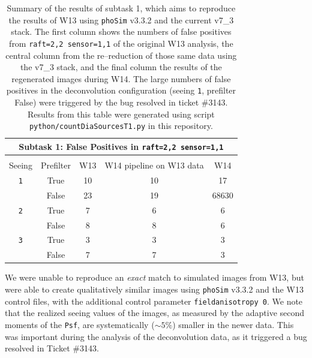 \documentclass[DM,toc]{lsstdoc}
\begin{document}
\begin{table}
\centering
\begin{tabular}{ccccc}
\hline
\multicolumn{5}{|c|}{Subtask 1: False Positives in {\tt raft=2,2 sensor=1,1}} \\ \hline \\
Seeing  & Prefilter    & W13  & W14 pipeline on W13 data   & W14   \\
\hline
{\tt 1} & True         & 10   & 10                         & 17    \\
        & False        & 23   & 19                         & 68630 \\
{\tt 2} & True         & 7    & 6                          & 6     \\
        & False        & 8    & 8                          & 6     \\
{\tt 3} & True         & 3    & 3                          & 3     \\
        & False        & 7    & 7                          & 3
\end{tabular}
\caption[]{Summary of the results of subtask 1, which aims to
  reproduce the results of W13 using {\tt phoSim} v3.3.2 and the
  current v7\_3 stack.  The first column shows the numbers of false
  positives from {\tt raft=2,2 sensor=1,1} of the original W13
  analysis, the central column from the re--reduction of those same
  data using the v7\_3 stack, and the final column the results of the
  regenerated images during W14.  The large numbers of false positives
  in the deconvolution configuration (seeing {\tt 1}, prefilter False)
  were triggered by the bug resolved in ticket \#3143.  Results from
  this table were generated using script {\tt
    python/countDiaSourcesT1.py} in this repository.}
\label{tab:task1}
\end{table}

We were unable to reproduce an {\it exact} match to simulated images
from W13, but were able to create qualitatively similar images using
{\tt phoSim} v3.3.2 and the W13 control files, with the additional
control parameter {\tt fieldanisotropy 0}.  We note that the realized
seeing values of the images, as measured by the adaptive second
moments of the {\tt Psf}, are systematically ($\sim 5\%$) smaller in
the newer data.  This was important during the analysis of the
deconvolution data, as it triggered a bug resolved in Ticket \#3143.
\end{document}
